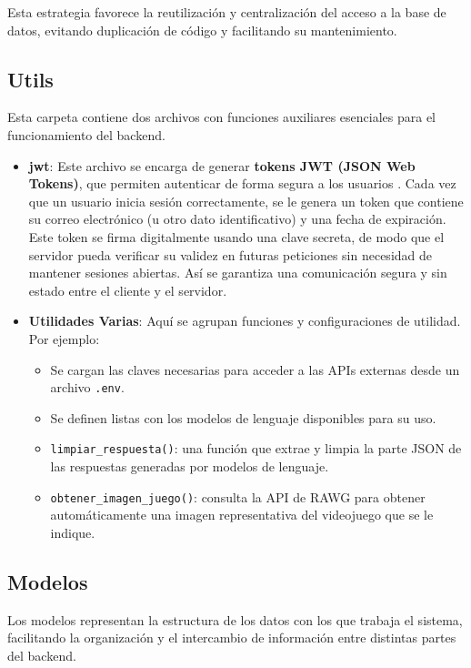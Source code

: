 Esta estrategia favorece la reutilización y centralización del acceso a la base de datos, evitando duplicación de código y facilitando su mantenimiento.


\subsection{Utils}

Esta carpeta contiene dos archivos con funciones auxiliares esenciales para el funcionamiento del backend.

\begin{itemize}
	\item \textbf{jwt}: Este archivo se encarga de generar \textbf{tokens JWT (JSON Web Tokens)}, que permiten autenticar de forma segura a los usuarios \cite{jones2015json}. Cada vez que un usuario inicia sesión correctamente, se le genera un token que contiene su correo electrónico (u otro dato identificativo) y una fecha de expiración. Este token se firma digitalmente usando una clave secreta, de modo que el servidor pueda verificar su validez en futuras peticiones sin necesidad de mantener sesiones abiertas. Así se garantiza una comunicación segura y sin estado entre el cliente y el servidor.
	
	\item \textbf{Utilidades Varias}: Aquí se agrupan funciones y configuraciones de utilidad. Por ejemplo:
	\begin{itemize}
		\item Se cargan las claves necesarias para acceder a las APIs externas desde un archivo \texttt{.env}.
		\item Se definen listas con los modelos de lenguaje disponibles para su uso.
		\item \texttt{limpiar\_respuesta()}: una función que extrae y limpia la parte JSON de las respuestas generadas por modelos de lenguaje.
		\item \texttt{obtener\_imagen\_juego()}: consulta la API de RAWG para obtener automáticamente una imagen representativa del videojuego que se le indique.
	\end{itemize}
\end{itemize}


\subsection{Modelos}

Los modelos representan la estructura de los datos con los que trabaja el sistema, facilitando la organización y el intercambio de información entre distintas partes del backend.

